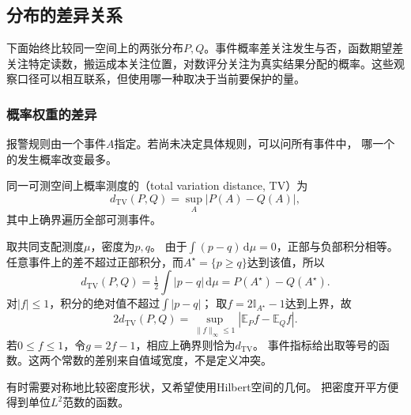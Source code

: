 \subsection{分布的差异关系}

下面始终比较同一空间上的两张分布\(P,Q\)。事件概率差关注发生与否，函数期望差关注特定读数，搬运成本关注位置，对数评分关注为真实结果分配的概率。这些观察口径可以相互联系，但使用哪一种取决于当前要保护的量。
\label{sec:information-distribution-discrepancies}


\subsubsection{概率权重的差异}
\label{sec:information-probability-discrepancy}

报警规则由一个事件\(A\)指定。若尚未决定具体规则，可以问所有事件中，
哪一个的发生概率改变最多。

\begin{definition}[总变差距离]
\label{def:information-total-variation}
同一可测空间上概率测度的（total variation distance, TV）为
\begin{equation}
  d_{\mathrm{TV}}(P,Q)=\sup_A|P(A)-Q(A)|,
  \label{eq:information-total-variation}
\end{equation}
其中上确界遍历全部可测事件。
\end{definition}

取共同支配测度\(\mu\)，密度为\(p,q\)。
由于\(\int(p-q)\,\mathrm d\mu=0\)，正部与负部积分相等。
任意事件上的差不超过正部积分，而\(A^\star=\{p\geq q\}\)达到该值，所以
\begin{equation}
  d_{\mathrm{TV}}(P,Q)=\tfrac12\int|p-q|\,\mathrm d\mu
   =P(A^\star)-Q(A^\star).
  \label{eq:information-tv-density}
\end{equation}
对\(|f|\leq1\)，积分的绝对值不超过\(\int|p-q|\)；
取\(f=2\mathbb I_{A^\star}-1\)达到上界，故
\begin{equation}
  2d_{\mathrm{TV}}(P,Q)
   =\sup_{\|f\|_\infty\leq1}|\mathbb E_Pf-\mathbb E_Qf|.
  \label{eq:information-tv-dual}
\end{equation}
若\(0\leq f\leq1\)，令\(g=2f-1\)，相应上确界则恰为\(d_{\mathrm{TV}}\)。
事件指标给出取等号的函数。这两个常数的差别来自值域宽度，不是定义冲突。

有时需要对称地比较密度形状，又希望使用Hilbert空间的几何。
把密度开平方便得到单位\(L^2\)范数的函数。

